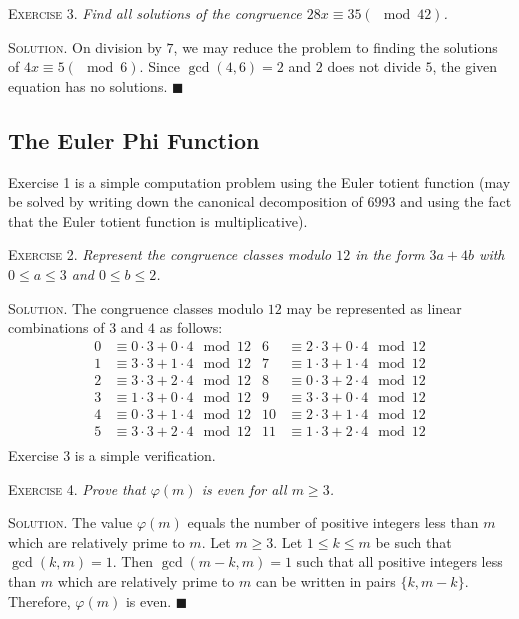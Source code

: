\documentclass[11pt, leqno]{article}
\newcommand{\done}{\ensuremath{\blacksquare}}
\begin{document}
\textsc{Exercise 3}. \emph{Find all solutions of the congruence $28x \equiv 35 (\mod 42)$.}

\textsc{Solution}. On division by $7$, we may reduce the problem to finding the solutions of $4x \equiv 5 (\mod 6)$. Since $\gcd(4,6) = 2$ and $2$ does not divide $5$, the given equation has no solutions. \done

\subsection{The Euler Phi Function}

Exercise 1 is a simple computation problem using the Euler totient function (may be solved by writing down the canonical decomposition of $6993$ and using the fact that the Euler totient function is multiplicative).

\textsc{Exercise 2}. \emph{Represent the congruence classes modulo $12$ in the form $3a+4b$ with $0\leq a \leq 3$ and $0\leq b \leq 2$.}

\textsc{Solution}. The congruence classes modulo $12$ may be represented as linear combinations of $3$ and $4$ as follows: 
\begin{align*}
  0 & \equiv 0\cdot 3 + 0\cdot 4 \mod 12 & 6 & \equiv 2\cdot 3 + 0\cdot 4 \mod 12 \\
  1 & \equiv 3\cdot 3 + 1\cdot 4 \mod 12 & 7 & \equiv 1\cdot 3 + 1\cdot 4 \mod 12\\
  2 & \equiv 3\cdot 3 + 2\cdot 4 \mod 12 & 8 & \equiv 0\cdot 3 + 2\cdot 4 \mod 12\\
  3 & \equiv 1\cdot 3 + 0\cdot 4 \mod 12 & 9 & \equiv 3\cdot 3 + 0\cdot 4 \mod 12\\
  4 & \equiv 0\cdot 3 + 1\cdot 4 \mod 12 & 10 & \equiv 2\cdot 3 + 1\cdot 4 \mod 12\\
  5 & \equiv 3\cdot 3 + 2\cdot 4 \mod 12 & 11 & \equiv 1\cdot 3 + 2\cdot 4 \mod 12\\
\end{align*}
Exercise 3 is a simple verification.

\textsc{Exercise 4}. \emph{Prove that $\varphi(m)$ is even for all $m\geq 3$.}

\textsc{Solution}. The value $\varphi(m)$ equals the number of positive integers less than $m$ which are relatively prime to $m$. Let $m\geq 3$. Let $1\leq k \leq m$ be such that $\gcd(k, m) = 1$. Then $\gcd(m-k, m) = 1$ such that all positive integers less than $m$ which are relatively prime to $m$ can be written in pairs $\{k, m-k\}$. Therefore, $\varphi(m)$ is even. \done
\end{document}
